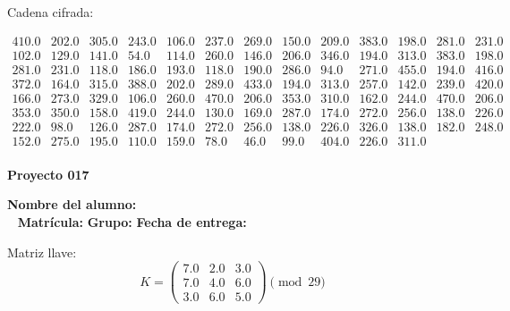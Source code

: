 \documentclass[12pt]{article}
\begin{document}
Cadena cifrada:
\begin{center}
$\begin{array}{lllllllllllll}
410.0 & 202.0 & 305.0 & 243.0 & 106.0 & 237.0 & 269.0 & 150.0 & 209.0 & 383.0 & 198.0 & 281.0 & 231.0\\
102.0 & 129.0 & 141.0 & 54.0 & 114.0 & 260.0 & 146.0 & 206.0 & 346.0 & 194.0 & 313.0 & 383.0 & 198.0\\
281.0 & 231.0 & 118.0 & 186.0 & 193.0 & 118.0 & 190.0 & 286.0 & 94.0 & 271.0 & 455.0 & 194.0 & 416.0\\
372.0 & 164.0 & 315.0 & 388.0 & 202.0 & 289.0 & 433.0 & 194.0 & 313.0 & 257.0 & 142.0 & 239.0 & 420.0\\
166.0 & 273.0 & 329.0 & 106.0 & 260.0 & 470.0 & 206.0 & 353.0 & 310.0 & 162.0 & 244.0 & 470.0 & 206.0\\
353.0 & 350.0 & 158.0 & 419.0 & 244.0 & 130.0 & 169.0 & 287.0 & 174.0 & 272.0 & 256.0 & 138.0 & 226.0\\
222.0 & 98.0 & 126.0 & 287.0 & 174.0 & 272.0 & 256.0 & 138.0 & 226.0 & 326.0 & 138.0 & 182.0 & 248.0\\
152.0 & 275.0 & 195.0 & 110.0 & 159.0 & 78.0 & 46.0 & 99.0 & 404.0 & 226.0 & 311.0\\
\end{array}$
\end{center}

\newpage


\textbf{Proyecto 017}

\textbf{Nombre del alumno:} \underline{\hspace{13cm}}\\\
\vspace{1cm}
\textbf{Matrícula:} \underline{\hspace{4cm}} \hspace{1cm}
\textbf{Grupo:} \underline{\hspace{2cm}}
\textbf{Fecha de entrega:} \underline{\hspace{2cm}}

\medskip

Matriz llave:
\[
K = \begin{pmatrix}
7.0 & 2.0 & 3.0\\
7.0 & 4.0 & 6.0\\
3.0 & 6.0 & 5.0
\end{pmatrix} \pmod{29}
\]
\end{document}

